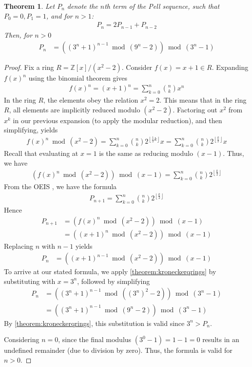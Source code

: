\documentclass[11pt,reqno]{article}
\theoremstyle{plain}
\newtheorem{theorem}{Theorem}
\theoremstyle{definition}
\newcommand{\floor}[1]{\left\lfloor #1 \right\rfloor}
\begin{document}
\begin{theorem} \label{theorem:pell}
Let $P_n$ denote the $n$th term of the Pell sequence, such that $P_0 = 0, P_1 = 1$, and for $n > 1$:
\begin{align*}
    P_n = 2 P_{n-1} + P_{n-2}
\end{align*}
Then, for $n > 0$
\begin{align*}
P_n &= \left((3^n+1)^{n-1} \bmod{(9^n-2)}\right) \bmod{(3^n-1)} 
\end{align*}
\end{theorem}
\begin{proof}
Fix a ring $R = \mathbb{Z}[x]/(x^2 - 2)$. Consider $f(x) = x+1 \in R$. Expanding $f(x)^n$ using the binomial theorem gives
\begin{align*}
    f(x)^n = (x+1)^n = \sum_{k=0}^{n} \binom{n}{k} x^n
\end{align*}
In the ring $R$, the elements obey the relation $x^2 = 2$. This means that in the ring $R$, all elements are implicitly reduced modulo $(x^2 - 2)$. Factoring out $x^2$ from $x^k$ in our previous expansion (to apply the modular reduction), and then simplifying, yields
\begin{align*}
    f(x)^n \bmod{(x^2 - 2)} = \sum_{k=0}^{n} \binom{n}{k} 2^{\floor{\frac{1}{2} k}} x
    = \sum_{k=0}^{n} \binom{n}{k} 2^{\floor{\frac{k}{2}}} x
\end{align*}
Recall that evaluating at $x=1$ is the same as reducing modulo $(x-1)$. Thus, we have
\begin{align*}
    \left(f(x)^n \bmod{(x^2-2)}\right) \bmod{(x-1)} = \sum_{k=0}^{n} \binom{n}{k} 2^{\floor{\frac{k}{2}}}
\end{align*}
From the OEIS \cite{A000129}, we have the formula
\begin{align*}
    P_{n+1} = \sum_{k=0}^{n} \binom{n}{k} 2^{\floor{\frac{k}{2}}}
\end{align*}
Hence
\begin{align*}
    P_{n+1} &= \left( f(x)^n \bmod{(x^2-2)} \right) \bmod{(x-1)} \\
    &= \left( (x+1)^n \bmod{(x^2-2)} \right) \bmod{(x-1)}
\end{align*}
Replacing $n$ with $n-1$ yields
\begin{align*}
    P_n &= \left((x+1)^{n-1} \bmod{(x^2-2)}\right) \bmod{(x-1)}
\end{align*}
To arrive at our stated formula, we apply \cref{theorem:kroneckerqrings} by substituting with $x = 3^n$, followed by simplifying
\begin{align*}
     P_n &= \left((3^n+1)^{n-1} \bmod{((3^n)^2-2)}\right) \bmod{(3^n-1)} \\
     &= \left((3^n+1)^{n-1} \bmod{(9^n-2)}\right) \bmod{(3^n-1)} 
\end{align*}
By \cref{theorem:kroneckerqrings}, this substitution is valid since $3^n > P_n$.

Considering $n = 0$, since the final modulus $(3^0-1) = 1 - 1 = 0$ results in an undefined remainder (due to division by zero). Thus, the formula is valid for $n > 0$.
\end{proof}
\end{document}
